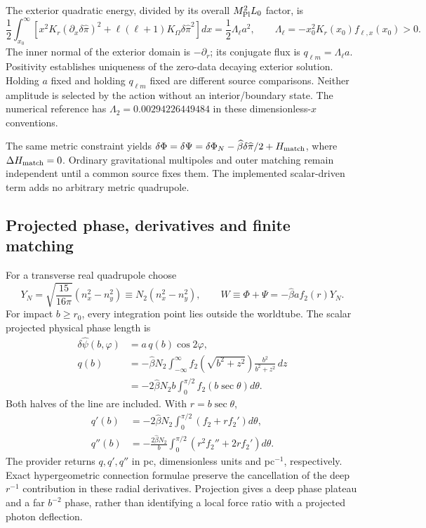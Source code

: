The exterior quadratic energy, divided by its overall
$M_{\rm Pl}^2L_0$ factor, is
\begin{equation}
 \frac12\int_{x_0}^\infty
 [x^2K_r(\partial_x\delta\widehat\pi)^2
 +\ell(\ell+1)K_\Omega\delta\widehat\pi^2]dx
 =\frac12\Lambda_\ell a^2,\qquad
 \Lambda_\ell=-x_0^2K_r(x_0)f_{\ell,x}(x_0)>0.
 \label{eq:ext-impedance}
\end{equation}
The inner normal of the exterior domain is $-\partial_r$; its conjugate
flux is $q_{\ell m}=\Lambda_\ell a$. Positivity establishes uniqueness
of the zero-data decaying exterior solution. Holding $a$ fixed and
holding $q_{\ell m}$ fixed are different source comparisons. Neither
amplitude is selected by the action without an interior/boundary state.
The numerical reference has $\Lambda_2=0.00294226449484$ in these
dimensionless-$x$ conventions.

The same metric constraint yields
$\delta\Phi=\delta\Psi=\delta\Phi_N-
\widehat\beta\delta\widehat\pi/2+H_{\rm match}$, where
$\Delta H_{\rm match}=0$. Ordinary gravitational multipoles and outer
matching remain independent until a common source fixes them. The
implemented scalar-driven term adds no arbitrary metric quadrupole.

\subsection{Projected phase, derivatives and finite matching}

For a transverse real quadrupole choose
\begin{equation}
 Y_N=\sqrt{\frac{15}{16\pi}}(n_x^2-n_y^2)
 \equiv N_2(n_x^2-n_y^2),\qquad
 W\equiv\Phi+\Psi=-\widehat\beta a f_2(r)Y_N.
\end{equation}
For impact $b\ge r_0$, every integration point lies outside the worldtube.
The scalar projected physical phase length is
\begin{align}
 \delta\widehat\psi(b,\varphi)&=a\,q(b)\cos2\varphi,\nonumber\\
 q(b)&=-\widehat\beta N_2\int_{-\infty}^{\infty}
 f_2(\sqrt{b^2+z^2})\frac{b^2}{b^2+z^2}\,dz\nonumber\\
 &=-2\widehat\beta N_2 b\int_0^{\pi/2}f_2(b\sec\theta)d\theta.
 \label{eq:ext-phase}
\end{align}
Both halves of the line are included. With $r=b\sec\theta$,
\begin{align}
 q'(b)&=-2\widehat\beta N_2\int_0^{\pi/2}(f_2+rf_2')d\theta,\nonumber\\
 q''(b)&=-\frac{2\widehat\beta N_2}{b}
 \int_0^{\pi/2}(r^2f_2''+2rf_2')d\theta.
 \label{eq:ext-phase-derivatives}
\end{align}
The provider returns $q,q',q''$ in pc, dimensionless units and
pc$^{-1}$, respectively. Exact hypergeometric connection formulae
preserve the cancellation of the deep $r^{-1}$ contribution in these
radial derivatives. Projection gives a deep phase plateau and a far
$b^{-2}$ phase, rather than identifying a local force ratio with
a projected photon deflection.

